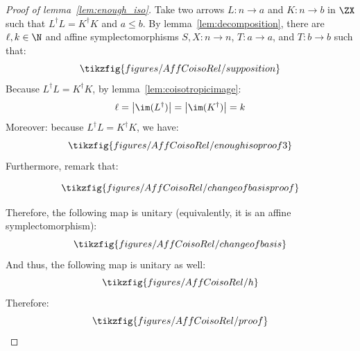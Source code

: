 \begin{proof}[Proof of lemma~\ref{lem:enough_iso}]
Take two arrows \(L:n\to a\) and \(K:n\to b\) in  \(\ZX\) such that \(L^\dag L = K^\dag K\) and \(a\leq b\).
By lemma~\ref{lem:decomposition}, there are \(\ell,k \in \N \) and affine symplectomorphisms \(S,X :n\to n\), \(T:a\to a\), and \(T:b\to b\) such that:
  \begin{equation}
    \label{eq:lhepimono}
    \tikzfig{figures/AffCoisoRel/supposition}
  \end{equation}
  Because \(L^\dag L = K^\dag K\), by lemma~\ref{lem:coisotropicimage}:
  \begin{equation}
    \ell=\left|\im(L^\dag)\right|=\left|\im( K^\dag)\right|=k
  \end{equation}
  Moreover: because $L^\dagger L = K^\dagger K$, we have:
  \begin{equation}
  \label{eq:positivemaps}
    \tikzfig{figures/AffCoisoRel/enoughisoproof3}
  \end{equation}
  Furthermore, remark that:
  
  \begin{equation}
  \label{eq:changeofbasis}
    \tikzfig{figures/AffCoisoRel/changeofbasisproof}
  \end{equation}
  
  Therefore, the following map is unitary (equivalently, it is an affine symplectomorphism):
  \begin{equation}
    \tikzfig{figures/AffCoisoRel/changeofbasis}
  \end{equation}
  And thus, the following map is unitary as well:
  \begin{equation}
    \label{eq:h}
    \tikzfig{figures/AffCoisoRel/h}
  \end{equation}
   Therefore:
  \begin{equation}
    \tikzfig{figures/AffCoisoRel/proof}
  \end{equation}
\end{proof}
% 
